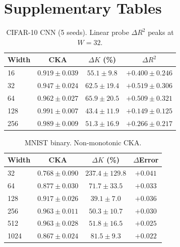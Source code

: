 \documentclass[twoside,11pt]{article}
\begin{document}
\section{Supplementary Tables}

\begin{table}[ht]
    \centering\footnotesize
    \caption{CIFAR-10 CNN (5 seeds). Linear probe $\Delta R^2$ peaks at $W=32$.}
    \label{tab:cnn_cifar}
    \begin{tabular}{lccc}
    \toprule
    Width & CKA & $\Delta K$ (\%) & $\Delta R^2$ \\
    \midrule
    16  & $0.919\pm0.039$ & $55.1\pm9.8$  & $+0.400\pm0.246$ \\
    32  & $0.947\pm0.024$ & $62.5\pm19.4$ & $+0.519\pm0.306$ \\
    64  & $0.962\pm0.027$ & $65.9\pm20.5$ & $+0.509\pm0.321$ \\
    128 & $0.991\pm0.007$ & $43.4\pm11.9$ & $+0.149\pm0.125$ \\
    256 & $0.989\pm0.009$ & $51.3\pm16.9$ & $+0.266\pm0.217$ \\
    \bottomrule
    \end{tabular}
\end{table}

\begin{table}[ht]
    \centering
    \caption{MNIST binary. Non-monotonic CKA.}
    \label{tab:mnist}
    \begin{tabular}{lccc}
    \toprule
    Width & CKA & $\Delta K$ (\%) & $\Delta$Error \\
    \midrule
    32   & $0.768\pm0.090$ & $237.4\pm129.8$ & $+0.041$ \\
    64   & $0.877\pm0.030$ & $71.7\pm33.5$   & $+0.033$ \\
    128  & $0.917\pm0.026$ & $39.1\pm7.0$    & $+0.036$ \\
    256  & $0.963\pm0.011$ & $50.3\pm10.7$   & $+0.030$ \\
    512  & $0.963\pm0.028$ & $51.8\pm16.5$   & $+0.025$ \\
    1024 & $0.867\pm0.024$ & $81.5\pm9.3$    & $+0.022$ \\
    \bottomrule
    \end{tabular}
\end{table}
\end{document}
